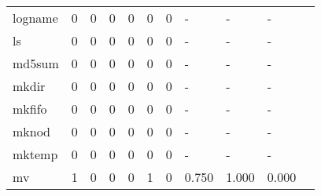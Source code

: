 \begin{longtable}{lp{1.10cm}p{1.10cm}p{1.10cm}p{1.10cm}p{1.10cm}p{1.10cm}p{1.10cm}p{1.10cm}p{1.10cm}p{1.10cm}}
logname   &                      0 &                                  0 &                                 0 &                                0 &                                 0 &                               0 &                              - &                                     - &                                   - \\
ls        &                      0 &                                  0 &                                 0 &                                0 &                                 0 &                               0 &                              - &                                     - &                                   - \\
md5sum    &                      0 &                                  0 &                                 0 &                                0 &                                 0 &                               0 &                              - &                                     - &                                   - \\
mkdir     &                      0 &                                  0 &                                 0 &                                0 &                                 0 &                               0 &                              - &                                     - &                                   - \\
mkfifo    &                      0 &                                  0 &                                 0 &                                0 &                                 0 &                               0 &                              - &                                     - &                                   - \\
mknod     &                      0 &                                  0 &                                 0 &                                0 &                                 0 &                               0 &                              - &                                     - &                                   - \\
mktemp    &                      0 &                                  0 &                                 0 &                                0 &                                 0 &                               0 &                              - &                                     - &                                   - \\
mv        &                      1 &                                  0 &                                 0 &                                0 &                                 1 &                               0 &                          0.750 &                                 1.000 &                               0.000 \\

\end{longtable}
